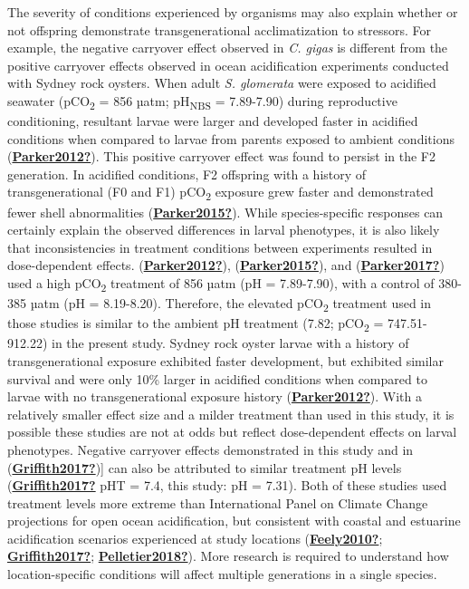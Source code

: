 \documentclass [11pt, proquest] {uwthesis}[2015/03/03]
\begin{document}
The severity of conditions experienced by organisms may also explain whether or not offspring demonstrate transgenerational acclimatization to stressors. For example, the negative carryover effect observed in \emph{C. gigas} is different from the positive carryover effects observed in ocean acidification experiments conducted with Sydney rock oysters. When adult \emph{S. glomerata} were exposed to acidified seawater (pCO\textsubscript{2} = 856 µatm; pH\textsubscript{NBS} = 7.89-7.90) during reproductive conditioning, resultant larvae were larger and developed faster in acidified conditions when compared to larvae from parents exposed to ambient conditions (\protect\hyperlink{ref-Parker2012}{\textbf{Parker2012?}}). This positive carryover effect was found to persist in the F2 generation. In acidified conditions, F2 offspring with a history of transgenerational (F0 and F1) pCO\textsubscript{2} exposure grew faster and demonstrated fewer shell abnormalities (\protect\hyperlink{ref-Parker2015}{\textbf{Parker2015?}}). While species-specific responses can certainly explain the observed differences in larval phenotypes, it is also likely that inconsistencies in treatment conditions between experiments resulted in dose-dependent effects. (\protect\hyperlink{ref-Parker2012}{\textbf{Parker2012?}}), (\protect\hyperlink{ref-Parker2015}{\textbf{Parker2015?}}), and (\protect\hyperlink{ref-Parker2017}{\textbf{Parker2017?}}) used a high pCO\textsubscript{2} treatment of 856 µatm (pH = 7.89-7.90), with a control of 380-385 µatm (pH = 8.19-8.20). Therefore, the elevated pCO\textsubscript{2} treatment used in those studies is similar to the ambient pH treatment (7.82; pCO\textsubscript{2} = 747.51-912.22) in the present study. Sydney rock oyster larvae with a history of transgenerational exposure exhibited faster development, but exhibited similar survival and were only 10\% larger in acidified conditions when compared to larvae with no transgenerational exposure history (\protect\hyperlink{ref-Parker2012}{\textbf{Parker2012?}}). With a relatively smaller effect size and a milder treatment than used in this study, it is possible these studies are not at odds but reflect dose-dependent effects on larval phenotypes. Negative carryover effects demonstrated in this study and in (\protect\hyperlink{ref-Griffith2017}{\textbf{Griffith2017?}}){]} can also be attributed to similar treatment pH levels (\protect\hyperlink{ref-Griffith2017}{\textbf{Griffith2017?}} pHT = 7.4, this study: pH = 7.31). Both of these studies used treatment levels more extreme than International Panel on Climate Change projections for open ocean acidification, but consistent with coastal and estuarine acidification scenarios experienced at study locations (\protect\hyperlink{ref-Feely2010}{\textbf{Feely2010?}}; \protect\hyperlink{ref-Griffith2017}{\textbf{Griffith2017?}}; \protect\hyperlink{ref-Pelletier2018}{\textbf{Pelletier2018?}}). More research is required to understand how location-specific conditions will affect multiple generations in a single species.
\end{document}
